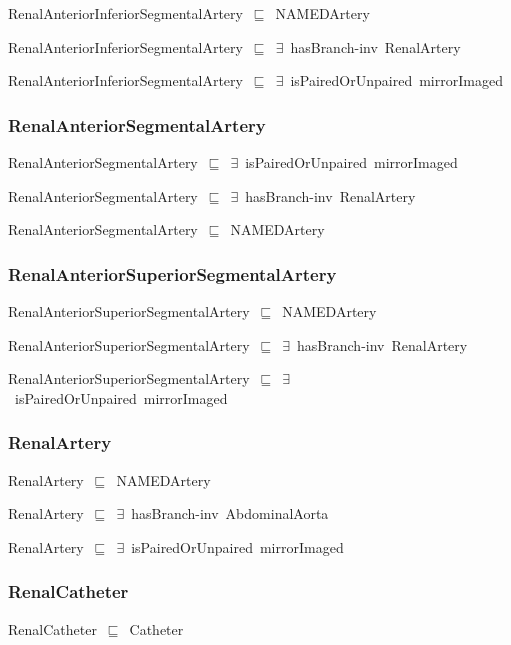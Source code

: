 \documentclass{article}
\begin{document}
RenalAnteriorInferiorSegmentalArtery~\ensuremath{\sqsubseteq}~NAMEDArtery~

RenalAnteriorInferiorSegmentalArtery~\ensuremath{\sqsubseteq}~\ensuremath{\exists}~hasBranch-inv~RenalArtery~

RenalAnteriorInferiorSegmentalArtery~\ensuremath{\sqsubseteq}~\ensuremath{\exists}~isPairedOrUnpaired~mirrorImaged~

\subsubsection*{RenalAnteriorSegmentalArtery}

RenalAnteriorSegmentalArtery~\ensuremath{\sqsubseteq}~\ensuremath{\exists}~isPairedOrUnpaired~mirrorImaged~

RenalAnteriorSegmentalArtery~\ensuremath{\sqsubseteq}~\ensuremath{\exists}~hasBranch-inv~RenalArtery~

RenalAnteriorSegmentalArtery~\ensuremath{\sqsubseteq}~NAMEDArtery~

\subsubsection*{RenalAnteriorSuperiorSegmentalArtery}

RenalAnteriorSuperiorSegmentalArtery~\ensuremath{\sqsubseteq}~NAMEDArtery~

RenalAnteriorSuperiorSegmentalArtery~\ensuremath{\sqsubseteq}~\ensuremath{\exists}~hasBranch-inv~RenalArtery~

RenalAnteriorSuperiorSegmentalArtery~\ensuremath{\sqsubseteq}~\ensuremath{\exists}~isPairedOrUnpaired~mirrorImaged~

\subsubsection*{RenalArtery}

RenalArtery~\ensuremath{\sqsubseteq}~NAMEDArtery~

RenalArtery~\ensuremath{\sqsubseteq}~\ensuremath{\exists}~hasBranch-inv~AbdominalAorta~

RenalArtery~\ensuremath{\sqsubseteq}~\ensuremath{\exists}~isPairedOrUnpaired~mirrorImaged~

\subsubsection*{RenalCatheter}

RenalCatheter~\ensuremath{\sqsubseteq}~Catheter~
\end{document}
